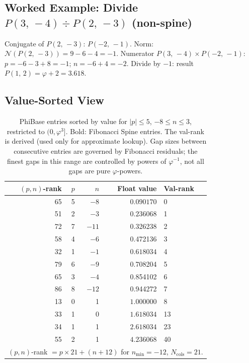 \documentclass[12pt]{article}
\theoremstyle{definition}
\theoremstyle{remark}
\newcommand{\Phib}[2]{P(#1,\,#2)}
\begin{document}
\subsection*{Worked Example: Divide $\Phib{3}{-4}\div\Phib{2}{-3}$ (non-spine)}
Conjugate of $\Phib{2}{-3}$: $\Phib{-2}{-1}$.
Norm: $\mathcal{N}(\Phib{2}{-3})=9-6-4=-1$.
Numerator $\Phib{3}{-4}\times\Phib{-2}{-1}$:
$p=-6-3+8=-1$; $n=-6+4=-2$.
Divide by $-1$: result $\Phib{1}{2}=\varphi+2=3.618$.\;\checkmark
\subsection*{Value-Sorted View}
\begin{table}[p]
\centering
\small
\caption{PhiBase entries sorted by value for $|p|\leq5$, $-8\leq n\leq3$,
  restricted to $(0,\varphi^3]$.  Bold: Fibonacci Spine entries.
  The val-rank is derived (used only for approximate lookup).
  Gap sizes between consecutive entries are governed by Fibonacci
  residuals; the finest gaps in this range are controlled by
  powers of $\varphi^{-1}$, not all gaps are pure $\varphi$-powers.}
\label{tab:phibase_teaching}
\begin{tabular}{rrrrl}
\toprule
$(p,n)$-rank & $p$ & $n$ & Float value & Val-rank \\
\midrule
 65 & 5 & $-8$ & $\mathbf{0.090170}$ & 0 \\
 51 & 2 & $-3$ & $\mathbf{0.236068}$ & 1 \\
 72 & 7 & $-11$& 0.326238 & 2 \\
 58 & 4 & $-6$ & 0.472136 & 3 \\
 32 & 1 & $-1$ & $\mathbf{0.618034}$ & 4 \\
 79 & 6 & $-9$ & 0.708204 & 5 \\
 65 & 3 & $-4$ & 0.854102 & 6 \\
 86 & 8 & $-12$& 0.944272 & 7 \\
 13 & 0 &  1   & $\mathbf{1.000000}$ & 8 \\
 33 & 1 &  0   & $\mathbf{1.618034}$ & 13 \\
 34 & 1 &  1   & $\mathbf{2.618034}$ & 23 \\
 55 & 2 &  1   & $\mathbf{4.236068}$ & 40 \\
\bottomrule
\multicolumn{5}{l}{\small $(p,n)$-rank $= p\times21+(n+12)$ for
  $n_\text{min}=-12$, $N_\text{cols}=21$.}
\end{tabular}
\end{table}
\end{document}
